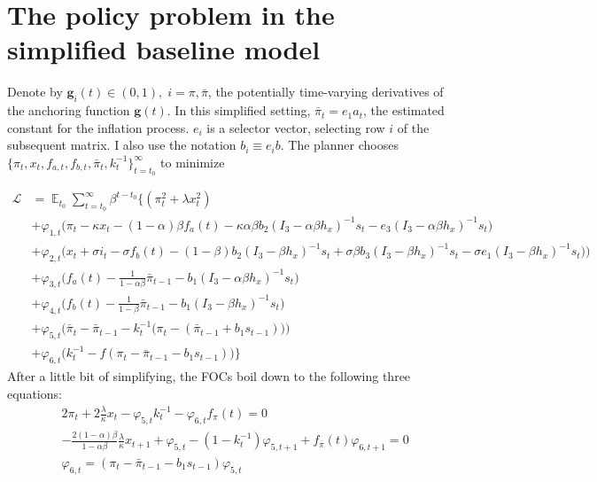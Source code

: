\documentclass[11pt]{article}
\renewcommand{\[}{\begin{equation}}
\renewcommand{\]}{\end{equation}}
\DeclareMathOperator{\E}{\mathbb{E}}
\begin{document}
\section{The policy problem in the simplified baseline model }\label{app_midsimple_problem}
Denote by $\mathbf{g}_i(t) \in (0,1), \; i=\pi, \bar{\pi}$, the potentially time-varying derivatives of the anchoring function $\mathbf{g}(t)$. In this simplified setting, $\bar{\pi}_t = e_1 a_t$, the estimated constant for the inflation process. $e_i$ is a selector vector, selecting row $i$ of the subsequent matrix. I also use the notation $b_i \equiv e_i b$.   The planner chooses $\{\pi_t, x_t, f_{a,t},  f_{b,t}, \bar{\pi}_t, k_t^{-1}\}_{t=t_0}^{\infty}$ to minimize

 \begin{align}
\mathcal{L} &= \E_{t_0}\sum_{t=t_0}^{\infty} \beta^{t-t_0}\bigg\{  (\pi_t^2  + \lambda x_t^2 )  \\
 & + \varphi_{1,t} \bigg(\pi_t - \kappa x_t -(1-\alpha)\beta f_a(t) -\kappa\alpha\beta b_2 (I_3 - \alpha\beta h_x)^{-1}s_t - e_3(I_3 - \alpha\beta h_x)^{-1}s_t \bigg) \label{midsimple_first}\\
 & + \varphi_{2,t} \bigg(x_t + \sigma i_t -\sigma f_b(t)  -  (1-\beta)b_2 (I_3 - \beta h_x)^{-1}s_t + \sigma\beta b_3 (I_3 - \beta h_x)^{-1}s_t -\sigma e_1(I_3 - \beta h_x)^{-1}s_t  \big)\bigg) \\
 & +  \varphi_{3,t}  \bigg(f_a(t) - \frac{1}{1-\alpha\beta}\bar{\pi}_{t-1}  - b_1(I_3 - \alpha\beta h_x)^{-1}s_t  \bigg) \\
 & + \varphi_{4,t}  \bigg(f_b(t) - \frac{1}{1-\beta}\bar{\pi}_{t-1}  - b_1(I_3 - \beta h_x)^{-1}s_t \bigg)  \\
  & + \varphi_{5,t}  \bigg(  \bar{\pi}_{t} - \bar{\pi}_{t-1} - k_t^{-1}\big(\pi_{t} -(\bar{\pi}_{t-1}+b_1 s_{t-1}) \big)   \bigg)  \\
  & + \varphi_{6,t}  \bigg(k_t^{-1} - f(\pi_t - \bar{\pi}_{t-1}-b_1 s_{t-1})  \bigg)
  \bigg\} \label{midsimple_last}
\end{align}
After a little bit of simplifying, the FOCs boil down to the following three equations:
\begin{align}
& 2\pi_t + 2\frac{\lambda}{\kappa}x_t -\varphi_{5,t} k_t^{-1} - \varphi_{6,t} f_{\pi}(t) = 0 \label{gaspar22}\\
& -\frac{2(1-\alpha)\beta}{1-\alpha\beta}\frac{\lambda}{\kappa}x_{t+1} + \varphi_{5,t} -(1-k_t^{-1})\varphi_{5,t+1} +f_{\bar{\pi}}(t)\varphi_{6,t+1} = 0 \label{gaspar21}\\
& \varphi_{6,t} = (\pi_t - \bar{\pi}_{t-1}-b_1 s_{t-1}) \varphi_{5,t} \label{constraints}
\end{align}
\end{document}
